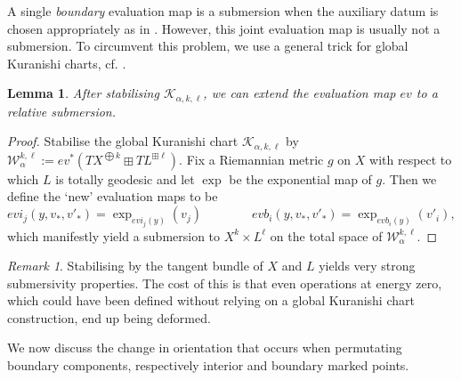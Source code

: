 \documentclass[11pt,psamsfonts, oneside, reqno]{amsart}
\newcommand{\eva}{ev}
\newcommand{\cK}{\mathcal{K}}
\newcommand{\cW}{\mathcal{W}}
\newcommand{\evai}{evi}
\newcommand{\evab}{evb}
\newtheorem{lemma}[theorem]{Lemma}
\theoremstyle{definition}
\theoremstyle{remark}
\newtheorem{remark}[theorem]{Remark}
\numberwithin{equation}{section}
\begin{document}
\noindent	
A single \emph{boundary} evaluation map is a submersion when the auxiliary datum is chosen appropriately as in \cite[Proposition~3.7]{Hir23}. 
However, this joint evaluation map is usually not a submersion. 
To circumvent this problem, we use a general trick for global Kuranishi charts, cf. \cite[Lemma~4.25]{AMS21}.

\begin{lemma}\label{lem:evaluation-relvative-submersion}
	After stabilising $\cK_{\alpha,k,\ell}$, we can extend the evaluation map $\eva$ to a relative submersion.
\end{lemma}

\begin{proof}
	\label{pf:stabilise-by-exponential-map} Stabilise the global Kuranishi chart $\cK_{\alpha,k,\ell}$ by $\cW^{k,\ell}_\alpha := \eva^*(TX^{\bigoplus k}\boxplus TL^{\boxplus \ell})$. Fix a Riemannian metric $g$ on $X$ with respect to which $L$ is totally geodesic and let $\exp$ be the exponential map of $g$. Then we define the `new' evaluation maps to be
	\begin{equation}\label{de:new-evaluation}\evai_j(y,v_*,v'_*) = \exp_{\evai_j(y)}(v_j) \qquad \qquad \evab_i(y,v_*,v'_*) = \exp_{\evab_i(y)}(v'_i),\end{equation}
	which manifestly yield a submersion to $X^k\times L^\ell$ on the total space of $\cW^{k,\ell}_\alpha$.
\end{proof}

\begin{remark}
	Stabilising by the tangent bundle of $X$ and $L$ yields very strong submersivity properties. The cost of this is that even operations at energy zero, which could have been defined without relying on a global Kuranishi chart construction, end up being deformed.
\end{remark}

\noindent
 We now discuss the change in orientation that occurs when permutating boundary components, respectively interior and boundary marked points.
\end{document}
